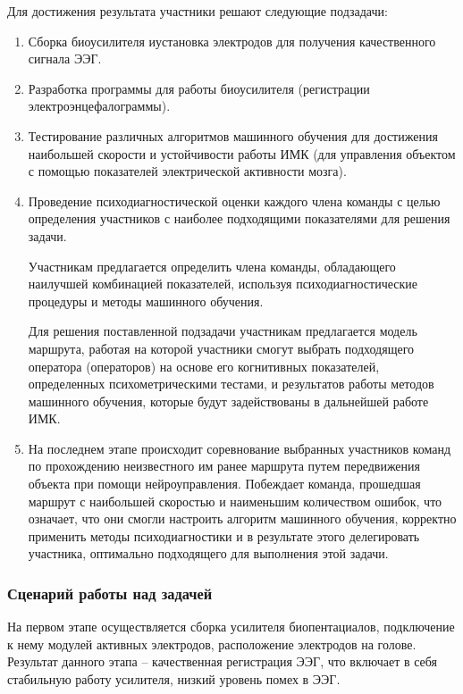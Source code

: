 Для достижения результата участники решают следующие подзадачи:
\begin{enumerate}
    \item Сборка биоусилителя иустановка электродов для получения качественного сигнала ЭЭГ.
    \item Разработка программы для работы биоусилителя (регистрации электроэнцефалограммы).
    \item Тестирование различных алгоритмов машинного обучения для достижения наибольшей скорости и устойчивости работы ИМК (для управления объектом с помощью показателей электрической активности мозга).
    \item Проведение психодиагностической оценки каждого члена команды с целью определения участников с наиболее подходящими показателями для решения задачи.
    
    Участникам предлагается определить члена команды, обладающего наилучшей комбинацией показателей, используя психодиагностические процедуры и методы машинного обучения.

    Для решения поставленной подзадачи участникам предлагается модель маршрута, работая на которой участники смогут выбрать подходящего оператора (операторов) на основе  его когнитивных показателей, определенных психометрическими тестами, и результатов работы методов  машинного обучения, которые будут задействованы в дальнейшей работе ИМК.
    \item На последнем этапе происходит соревнование выбранных участников команд по прохождению неизвестного им ранее маршрута путем передвижения объекта при помощи нейроуправления. Побеждает команда, прошедшая маршрут с наибольшей скоростью и наименьшим количеством ошибок, что означает, что они смогли настроить алгоритм машинного обучения, корректно применить методы психодиагностики и в результате этого делегировать участника, оптимально подходящего для выполнения этой задачи.
\end{enumerate}

\subsubsection*{Сценарий работы над задачей}

На первом этапе осуществляется сборка усилителя биопентациалов, подключение к нему модулей активных электродов, расположение электродов на голове. Результат данного этапа – качественная регистрация ЭЭГ, что включает в себя стабильную работу усилителя, низкий уровень помех в ЭЭГ.

